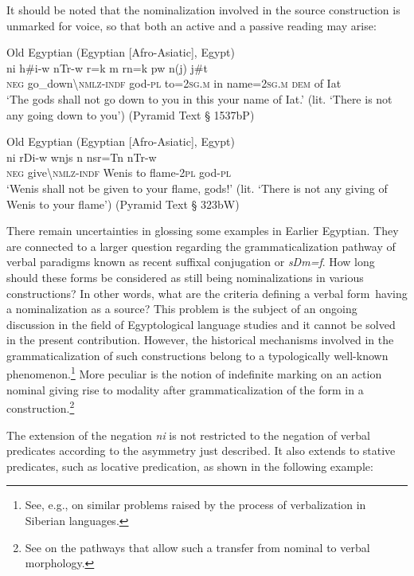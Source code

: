 \documentclass[output=paper]{langsci/langscibook}
\begin{document}
It should be noted that the nominalization involved in the source construction is unmarked for voice, so that both an active and a passive reading may arise:

\ea Old Egyptian (Egyptian [Afro-Asiatic], Egypt) \label{ex:AE9}\\
	\gll ni h\#i-w nTr-w r=k m rn=k pw n(j) j\#t\\ 
	\textsc{neg} go\_down\textbackslash\textsc{nmlz-indf} god-\textsc{pl} to=\textsc{2sg.m} in name=\textsc{2sg.m} \textsc{dem} of Iat\\
		‘The gods shall not go down to you in this your name of Iat.’ (lit. ‘There is not any going down to you’) (Pyramid Text § 1537bP)
\z

\ea Old Egyptian (Egyptian [Afro-Asiatic], Egypt) \label{ex:AE10}\\ 
	\gll ni rDi-w wnjs n nsr=Tn nTr-w\\ 
	\textsc{neg} give\textbackslash\textsc{nmlz-indf} Wenis to flame-\textsc{2pl} god-\textsc{pl}\\ 
	\glt ‘Wenis shall not be given to your flame, gods!’ (lit. ‘There is not any giving of Wenis to your flame’) (Pyramid Text § 323bW)
\z 	

There remain uncertainties in glossing some examples in Earlier Egyptian. They are connected to a larger question regarding the grammaticalization pathway of verbal paradigms known as recent suffixal conjugation or \textit{sDm=f}. How long should these forms be considered as still being nominalizations in various constructions? In other words, what are the criteria defining a verbal form having a nominalization as a source? This problem is the subject of an ongoing discussion in the field of Egyptological language studies and it cannot be solved in the present contribution. However, the historical mechanisms involved in the grammaticalization of such constructions belong to a typologically well-known phenomenon.\footnote{See, e.g., \citet{Malchukov2013} on similar problems raised by the process of verbalization in Siberian languages.} More peculiar is the notion of indefinite marking on an action nominal giving rise to modality after grammaticalization of the form in a construction.\footnote{See \citet{Oreal2017} on the pathways that allow such a transfer from nominal to verbal morphology.}

The extension of the negation \textit{ni} is not restricted to the negation of verbal predicates according to the asymmetry just described. It also extends to stative predicates, such as locative predication, as shown in the following example:
\end{document}
